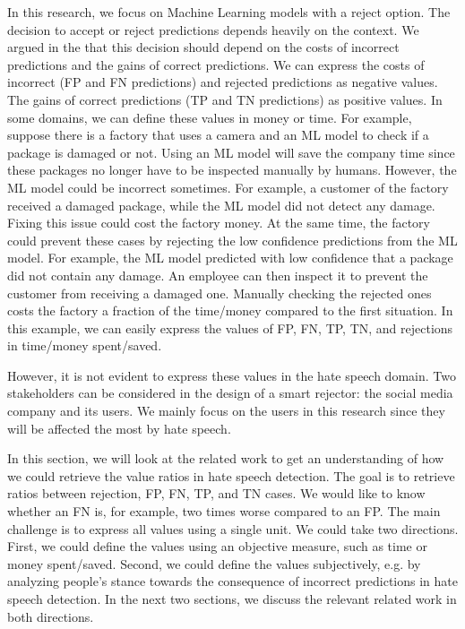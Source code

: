 In this research, we focus on Machine Learning models with a reject option. The decision to accept or reject predictions depends heavily on the context. We argued in the  that this decision should depend on the costs of incorrect predictions and the gains of correct predictions. We can express the costs of incorrect (FP and FN predictions) and rejected predictions as negative values. The gains of correct predictions (TP and TN predictions) as positive values. In some domains, we can define these values in money or time. For example, suppose there is a factory that uses a camera and an ML model to check if a package is damaged or not. Using an ML model will save the company time since these packages no longer have to be inspected manually by humans. However, the ML model could be incorrect sometimes. For example, a customer of the factory received a damaged package, while the ML model did not detect any damage. Fixing this issue could cost the factory money. At the same time, the factory could prevent these cases by rejecting the low confidence predictions from the ML model. For example, the ML model predicted with low confidence that a package did not contain any damage. An employee can then inspect it to prevent the customer from receiving a damaged one. Manually checking the rejected ones costs the factory a fraction of the time/money compared to the first situation. In this example, we can easily express the values of FP, FN, TP, TN, and rejections in time/money spent/saved.

However, it is not evident to express these values in the hate speech domain. Two stakeholders can be considered in the design of a smart rejector: the social media company and its users. We mainly focus on the users in this research since they will be affected the most by hate speech.

In this section, we will look at the related work to get an understanding of how we could retrieve the value ratios in hate speech detection. The goal is to retrieve ratios between rejection, FP, FN, TP, and TN cases. We would like to know whether an FN is, for example, two times worse compared to an FP. The main challenge is to express all values using a single unit. We could take two directions. First, we could define the values using an objective measure, such as time or money spent/saved. Second, we could define the values subjectively, e.g. by analyzing people's stance towards the consequence of incorrect predictions in hate speech detection. In the next two sections, we discuss the relevant related work in both directions.

